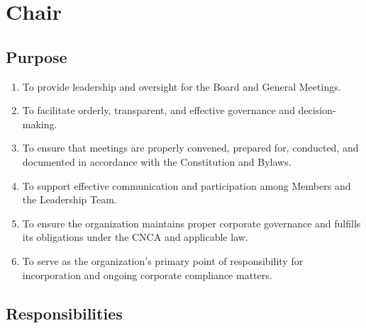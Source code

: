 \section{Chair}
\label{chair}

\subsection{Purpose}
\label{chair-purpose}

\begin{enumerate}
 \item To provide leadership and oversight for the Board and General Meetings.
 \item To facilitate orderly, transparent, and effective governance and decision-making.
 \item To ensure that meetings are properly convened, prepared for, conducted, and documented in accordance with the Constitution and Bylaws.
 \item To support effective communication and participation among Members and the Leadership Team.
 \item To ensure the organization maintains proper corporate governance and fulfills its obligations under the CNCA and applicable law.
 \item To serve as the organization’s primary point of responsibility for incorporation and ongoing corporate compliance matters.
\end{enumerate}

\subsection{Responsibilities}
\label{chair-responsibilities}

